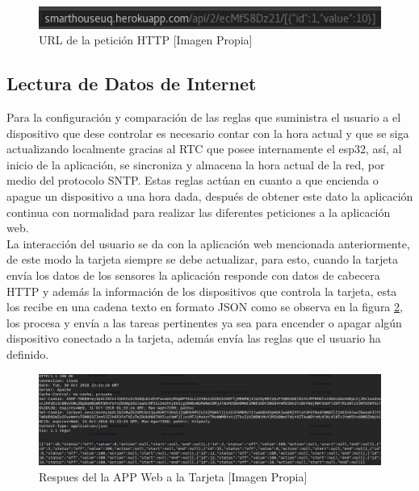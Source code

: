 \begin{figure}[H]
	\centering
	\caption{URL de la petición HTTP [Imagen Propia]}
	\label{fig:json}
	\includegraphics[width=0.7\linewidth]{Imagenes/JSON}
\end{figure}


\subsection{Lectura de Datos de Internet}

Para la configuración y comparación de las reglas que suministra el usuario a el dispositivo que dese controlar es necesario contar con la hora actual y que se siga actualizando localmente gracias al RTC que posee internamente el esp32, así, al inicio de la aplicación, se sincroniza y almacena la hora actual de la red, por medio del protocolo SNTP. Estas reglas actúan en cuanto a que encienda o apague un dispositivo a una hora dada, después de obtener este dato la aplicación continua con normalidad para realizar las diferentes peticiones a la aplicación web.\\

La interacción del usuario se da con la aplicación web mencionada anteriormente, de este modo la tarjeta siempre se debe actualizar, para esto, cuando la tarjeta envía los datos de los sensores la aplicación responde con datos de cabecera HTTP y además la información de los dispositivos que controla la tarjeta, esta los recibe en una cadena texto en formato JSON como se observa en la figura \ref{fig:httprqstesp}, los procesa y envía a las tareas pertinentes ya sea para encender o apagar algún dispositivo conectado a la tarjeta, además envía las reglas que el usuario ha definido.\\

\begin{figure}[H]
	\centering
	\caption{Respues del la APP Web a la Tarjeta [Imagen Propia]}
	\label{fig:httprqstesp}
	\includegraphics[width=0.8\linewidth]{Imagenes/HTTPRqstesp}
\end{figure}


